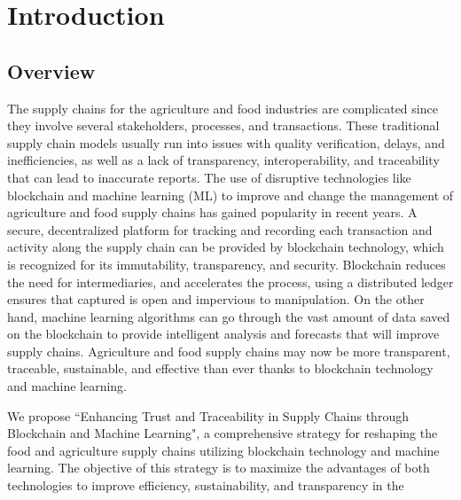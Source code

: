
\chapter{Introduction}\doublespacing %

\label{Chapter1} %



\section{Overview}
\noindent
The supply chains for the agriculture and food industries are complicated since they involve several stakeholders, processes, and 
transactions. These traditional supply chain models usually run into issues with quality verification, delays, and inefficiencies, as 
well as a lack of transparency, interoperability, and traceability that can lead to inaccurate reports. The use of disruptive technologies 
like blockchain and machine learning (ML) to improve and change the management of agriculture and food supply chains has 
gained popularity in recent years. A secure, decentralized platform for tracking and recording each transaction and activity along 
the supply chain can be provided by blockchain technology, which is recognized for its immutability, transparency, and security. 
Blockchain reduces the need for intermediaries, and accelerates the process, using a distributed ledger ensures that captured is open 
and impervious to manipulation. On the other hand, machine learning algorithms can go through the vast amount of data saved on 
the blockchain to provide intelligent analysis and forecasts that will improve supply chains. Agriculture and food supply chains 
may now be more transparent, traceable, sustainable, and effective than ever thanks to blockchain technology and machine learning. 
\par We propose ``Enhancing Trust and Traceability in Supply Chains through Blockchain and Machine Learning", a comprehensive 
strategy for reshaping the food and agriculture supply chains utilizing blockchain technology and machine learning. The objective 
of this strategy is to maximize the advantages of both technologies to improve efficiency, sustainability, and transparency in the 
